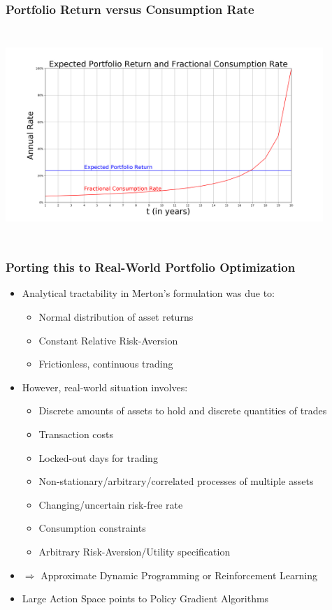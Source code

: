 \documentclass[handout]{beamer}
\begin{document}
\begin{frame}
\frametitle{Portfolio Return versus Consumption Rate}
\includegraphics[width=12cm, height=8cm]{portfolio.png}
\end{frame}


\begin{frame}
\frametitle{Porting this to Real-World Portfolio Optimization}
\pause
\begin{itemize}[<+->]
\item Analytical tractability in Merton's formulation was due to:
\begin{itemize}
\item Normal distribution of asset returns
\item Constant Relative Risk-Aversion
\item Frictionless, continuous trading
\end{itemize}
\item However, real-world situation involves:
\begin{itemize}
\item Discrete amounts of assets to hold and discrete quantities of trades
\item Transaction costs
\item Locked-out days for trading
\item Non-stationary/arbitrary/correlated processes of multiple assets
\item Changing/uncertain risk-free rate
\item Consumption constraints
\item Arbitrary Risk-Aversion/Utility specification
\end{itemize}
\item $\Rightarrow$ Approximate Dynamic Programming or Reinforcement Learning
\item Large Action Space points to Policy Gradient Algorithms
\end{itemize}
\end{frame}
\end{document}
